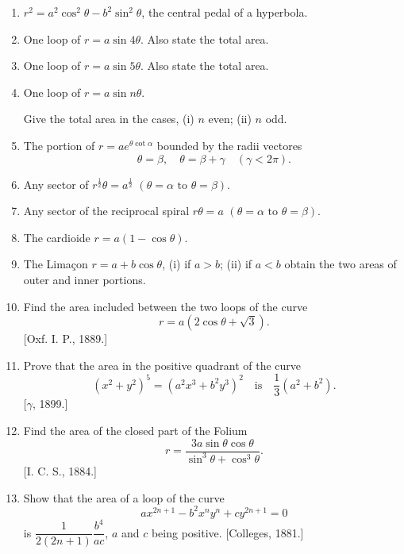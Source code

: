 \documentclass[11pt, a4paper]{article}
\newcommand{\source}[1]{\hfill\textnormal{[#1]}}
\begin{document}
\begin{enumerate}[leftmargin=2em]

\item $r^2=a^2\cos^2\theta-b^2\sin^2\theta$, the central pedal of a hyperbola.

\item One loop of $r=a\sin4\theta$. Also state the total area.

\item One loop of $r=a\sin5\theta$. Also state the total area.

\item One loop of $r=a\sin n\theta$.

Give the total area in the cases, (i) $n$ even; (ii) $n$ odd.

\item The portion of $r=ae^{\theta\cot\alpha}$ bounded by the radii vectores
\[
\theta=\beta,\quad \theta=\beta+\gamma\quad(\gamma<2\pi).
\]

\item Any sector of $r^{\frac12}\theta=a^{\frac12}$ $(\theta=\alpha \text{ to } \theta=\beta)$.

\item Any sector of the reciprocal spiral $r\theta=a$ $(\theta=\alpha \text{ to } \theta=\beta)$.

\item The cardioide $r=a(1-\cos\theta)$.

\item The Lima\c{c}on $r=a+b\cos\theta$, (i) if $a>b$; (ii) if $a<b$ obtain the two areas of outer and inner portions.

\item Find the area included between the two loops of the curve
\[
r=a(2\cos\theta+\sqrt3).
\]
\source{Oxf. I. P., 1889.}

\item Prove that the area in the positive quadrant of the curve
\[
(x^2+y^2)^5=(a^2x^3+b^2y^3)^2\quad\text{is}\quad\frac13(a^2+b^2).
\]
\source{$\gamma$, 1899.}

\item Find the area of the closed part of the Folium
\[
r=\frac{3a\sin\theta\cos\theta}{\sin^3\theta+\cos^3\theta}.
\]
\source{I. C. S., 1884.}

\item Show that the area of a loop of the curve
\[
ax^{2n+1}-b^2x^ny^n+cy^{2n+1}=0
\]
is $\dfrac{1}{2(2n+1)}\dfrac{b^4}{ac}$, $a$ and $c$ being positive. \source{Colleges, 1881.}


\end{enumerate}
\end{document}
